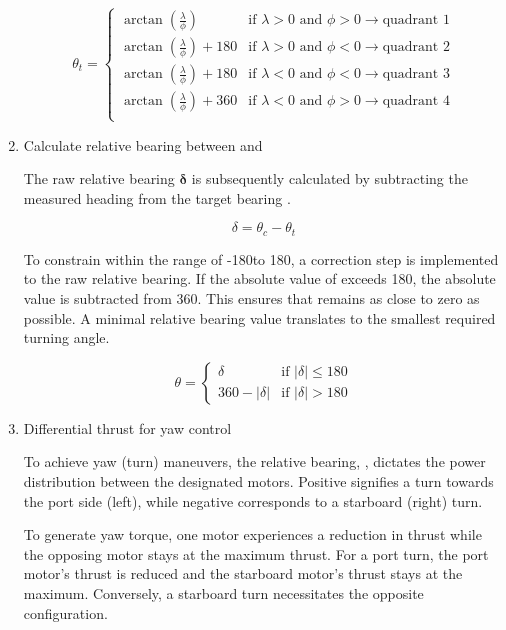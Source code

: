 \begin{enumerate}
        $$ \theta_t = \begin{cases}
            \arctan(\frac{\lambda}{\phi})       & \text{if } \lambda > 0 \text{ and } \phi > 0 \rightarrow \text{quadrant 1} \\
            \arctan(\frac{\lambda}{\phi}) + 180 & \text{if } \lambda > 0 \text{ and } \phi < 0 \rightarrow \text{quadrant 2} \\
            \arctan(\frac{\lambda}{\phi}) + 180 & \text{if } \lambda < 0 \text{ and } \phi < 0 \rightarrow \text{quadrant 3} \\
            \arctan(\frac{\lambda}{\phi}) + 360 & \text{if } \lambda < 0 \text{ and } \phi > 0 \rightarrow \text{quadrant 4} \\
          \end{cases} $$

  \item Calculate relative bearing \rBearing between \bearing and \heading

        The raw relative bearing $\boldsymbol{\delta}$ is subsequently calculated by subtracting the measured heading \heading from the target bearing \bearing.

        $$ \delta = \theta_c - \theta_t $$

        To constrain \rBearing within the range of -180\degrees \space to 180\degrees, a correction step is implemented to the raw relative bearing. If the absolute value of \rawBearing exceeds
        180\degrees, the absolute value \rawBearing is subtracted from 360\degrees. This ensures that \rBearing remains as close to zero as possible.
        A minimal relative bearing value translates to the smallest required turning angle.

        $$ \theta = \begin{cases}
            \delta         & \text{if } |\delta| \leq 180 \\
            360 - |\delta| & \text{if } |\delta| > 180
          \end{cases} $$

  \item Differential thrust for yaw control
  
        To achieve yaw (turn) maneuvers, the relative bearing, \rBearing, dictates the power distribution between the designated motors. Positive \rBearing signifies a turn
        towards the port side (left), while negative \rBearing corresponds to a starboard (right) turn.

        To generate yaw torque, one motor experiences a reduction in thrust while the opposing motor stays at the maximum thrust. For a port turn, the port motor's thrust is reduced
        and the starboard motor's thrust stays at the maximum. Conversely, a starboard turn necessitates the opposite configuration.


\end{enumerate}
